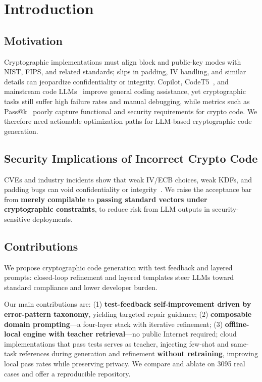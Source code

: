 \documentclass[runningheads]{llncs}
\begin{document}
\section{Introduction}
\subsection{Motivation}
Cryptographic implementations must align block and public-key modes with NIST, FIPS, and related standards; slips in padding, IV handling, and similar details can jeopardize confidentiality or integrity. Copilot, CodeT5~\cite{codet5}, and mainstream code LLMs~\cite{codex,codellama,deepseekcoder,starcoder} improve general coding assistance, yet cryptographic tasks still suffer high failure rates and manual debugging, while metrics such as Pass@k~\cite{codex} poorly capture functional and security requirements for crypto code. We therefore need actionable optimization paths for LLM-based cryptographic code generation.

\subsection{Security Implications of Incorrect Crypto Code}
\label{subsec:security_implications}
CVEs and industry incidents show that weak IV/ECB choices, weak KDFs, and padding bugs can void confidentiality or integrity~\cite{secsurvey,cryptollm}. We raise the acceptance bar from \textbf{merely compilable} to \textbf{passing standard vectors under cryptographic constraints}, to reduce risk from LLM outputs in security-sensitive deployments.

\subsection{Contributions}
We propose cryptographic code generation with test feedback and layered prompts: closed-loop refinement and layered templates steer LLMs toward standard compliance and lower developer burden.

Our main contributions are: (1) \textbf{test-feedback self-improvement driven by error-pattern taxonomy}, yielding targeted repair guidance; (2) \textbf{composable domain prompting}---a four-layer stack with iterative refinement; (3) \textbf{offline-local engine with teacher retrieval}---no public Internet required; cloud implementations that pass tests serves as teacher, injecting few-shot and same-task references during generation and refinement \textbf{without retraining}, improving local pass rates while preserving privacy. We compare and ablate on 3095 real cases and offer a reproducible repository.
\end{document}

